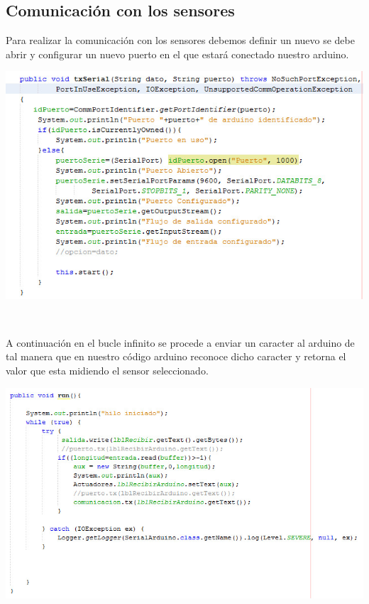 \documentclass[12pt]{report}
\begin{document}
\subsection{Comunicación con los sensores}
Para realizar la comunicación con los sensores debemos definir un nuevo se debe abrir y configurar un nuevo puerto en el que estará conectado nuestro arduino.
\begin{center}
\includegraphics[scale=0.6]{Documento/Figuras/15.jpeg}
\begin{scriptsize}
\\ 
\end{scriptsize}
\end{center}

A continuación en el bucle infinito se procede a enviar un caracter al arduino de tal manera que en nuestro código arduino reconoce dicho caracter y retorna el valor que esta midiendo el sensor seleccionado.
\begin{center}
\includegraphics[scale=0.6]{Documento/Figuras/16.jpeg}
\begin{scriptsize}
\\ 
\end{scriptsize}
\end{center}
\end{document}
